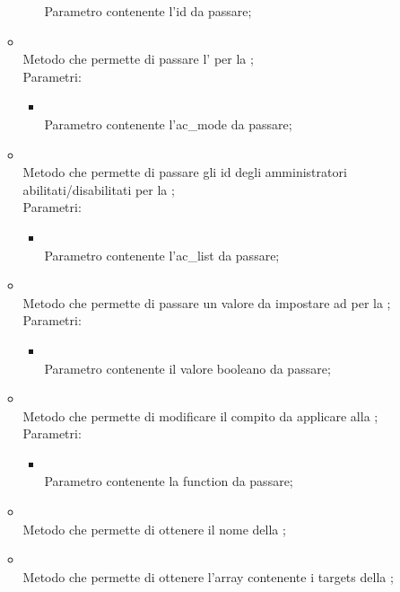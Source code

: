 \begin{itemize}
\begin{itemize}
\begin{itemize}
			Parametro contenente l'id da passare;
		\end{itemize}
		\item[]  \\		Metodo che permette di passare l' per la ;\\
		Parametri:
		\begin{itemize}
			\item {} \\
			Parametro contenente l'ac\_mode da passare;
		\end{itemize}
		\item[]  \\		Metodo che permette di passare gli id degli amministratori abilitati/disabilitati per la ;\\
		Parametri:
		\begin{itemize}
			\item {} \\
			Parametro contenente l'ac\_list da passare;
		\end{itemize}
		\item[]  \\		Metodo che permette di passare un valore da impostare ad  per la ;\\
		Parametri:
		\begin{itemize}
			\item {} \\
			Parametro contenente il valore booleano da passare;
		\end{itemize}
		\item[]  \\		Metodo che permette di modificare il compito da applicare alla ;\\
		Parametri:
		\begin{itemize}
			\item {} \\
			Parametro contenente la function da passare;
		\end{itemize}
		\item[]  \\		Metodo che permette di ottenere il nome della ;\\
		\item[]  \\		Metodo che permette di ottenere l'array contenente i targets della ;\\

\end{itemize}
\end{itemize}
